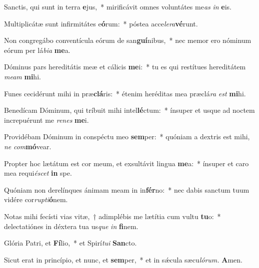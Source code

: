 \item Sanctis, qui sunt in terra \textbf{e}jus,~* mirificávit omnes voluntátes me\textit{as} \textit{in} \textbf{e}is.
\item Multiplicátæ sunt infirmitátes e\textbf{ó}rum:~* póstea acce\textit{lera}\textbf{vé}runt.
\item Non congregábo conventícula eórum de san\textbf{guí}nibus,~* nec memor ero nóminum eórum per lá\textit{bia} \textbf{me}a.
\item Dóminus pars hereditátis meæ et cálicis \textbf{me}i:~* tu es qui restítues hereditátem \textit{meam} \textbf{mi}hi.
\item Funes cecidérunt mihi in præ\textbf{clá}ris:~* étenim heréditas mea præclá\textit{ra} \textit{est} \textbf{mi}hi.
\item Benedícam Dóminum, qui tríbuit mihi intel\textbf{lé}ctum:~* ínsuper et usque ad noctem increpuérunt me \textit{renes} \textbf{me}i.
\item Providébam Dóminum in conspé\-ctu meo \textbf{sem}per:~* quóniam a dextris est mihi, \textit{ne} \textit{com}\textbf{mó}vear.
\item Propter hoc lætátum est cor meum, et exsultávit lingua \textbf{me}a:~* ínsuper et caro mea requi\textit{éscet} \textbf{in} spe.
\item Quóniam non derelínques ánimam meam in in\textbf{fér}no:~* nec dabis san\-ctum tuum vidére cor\textit{rupti}\textbf{ó}nem.
\item Notas mihi fecísti vias vitæ,~† adimplébis me lætítia cum vultu \textbf{tu}o:~* dele\-ctatiónes in déxtera tua us\textit{que} \textit{in} \textbf{fi}nem.
\item Glória Patri, et \textbf{Fí}lio,~* et Spirí\hspace{0.03em}\textit{tui} \textbf{San}cto.
\item Sicut erat in princípio, et nunc, et \textbf{sem}per,~* et in sǽcula sæcu\hspace{0.03em}\textit{lórum.} \textbf{A}men.
